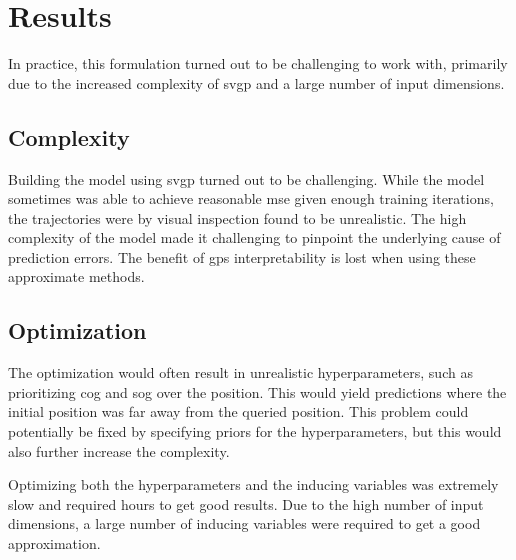 \section{Results}

In practice, this formulation turned out to be challenging to work with, primarily due to the increased complexity of \acrshort{svgp} and a large number of input dimensions.

\subsection{Complexity}
Building the model using \acrshort{svgp} turned out to be challenging. While the model sometimes was able to achieve reasonable \acrshort{mse} given enough training iterations, the trajectories were by visual inspection found to be unrealistic. The high complexity of the model made it challenging to pinpoint the underlying cause of prediction errors. The benefit of \acrshort{gp}s interpretability is lost when using these approximate methods.

\subsection{Optimization}
The optimization would often result in unrealistic hyperparameters, such as prioritizing \acrshort{cog} and \acrshort{sog} over the position. This would yield predictions where the initial position was far away from the queried position. This problem could potentially be fixed by specifying priors for the hyperparameters, but this would also further increase the complexity. 

Optimizing both the hyperparameters and the inducing variables was extremely slow and required hours to get good results. Due to the high number of input dimensions, a large number of inducing variables were required to get a good approximation. 




